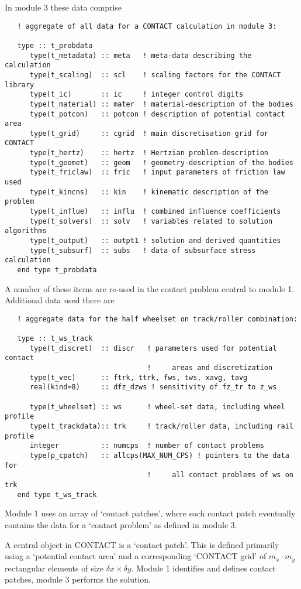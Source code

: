 \documentclass[12pt]{report}
\begin{document}
In module 3 these data comprise
{\small\begin{verbatim}
   ! aggregate of all data for a CONTACT calculation in module 3:

   type :: t_probdata
      type(t_metadata) :: meta   ! meta-data describing the calculation
      type(t_scaling)  :: scl    ! scaling factors for the CONTACT library
      type(t_ic)       :: ic     ! integer control digits
      type(t_material) :: mater  ! material-description of the bodies
      type(t_potcon)   :: potcon ! description of potential contact area
      type(t_grid)     :: cgrid  ! main discretisation grid for CONTACT
      type(t_hertz)    :: hertz  ! Hertzian problem-description
      type(t_geomet)   :: geom   ! geometry-description of the bodies
      type(t_friclaw)  :: fric   ! input parameters of friction law used
      type(t_kincns)   :: kin    ! kinematic description of the problem
      type(t_influe)   :: influ  ! combined influence coefficients
      type(t_solvers)  :: solv   ! variables related to solution algorithms
      type(t_output)   :: outpt1 ! solution and derived quantities
      type(t_subsurf)  :: subs   ! data of subsurface stress calculation
   end type t_probdata
\end{verbatim}}
A number of these items are re-used in the contact problem central to module
1. Additional data used there are
{\small\begin{verbatim}
   ! aggregate data for the half wheelset on track/roller combination:

   type :: t_ws_track
      type(t_discret)  :: discr   ! parameters used for potential contact
                                  !     areas and discretization
      type(t_vec)      :: ftrk, ttrk, fws, tws, xavg, tavg
      real(kind=8)     :: dfz_dzws ! sensitivity of fz_tr to z_ws

      type(t_wheelset) :: ws      ! wheel-set data, including wheel profile
      type(t_trackdata):: trk     ! track/roller data, including rail profile
      integer          :: numcps  ! number of contact problems
      type(p_cpatch)   :: allcps(MAX_NUM_CPS) ! pointers to the data for
                                  !     all contact problems of ws on trk
   end type t_ws_track
\end{verbatim}}
Module 1 uses an array of `contact patches', where each contact patch
eventually contains the data for a `contact problem' as defined in module
3.

A central object in CONTACT is a `contact patch'. This is defined
primarily using a `potential contact area' and a corresponding `CONTACT
grid' of $m_x\cdot m_y$ rectangular elements of size $\delta
x\times\delta y$. Module 1 identifies and defines contact patches, module 3
performs the solution.
\end{document}
